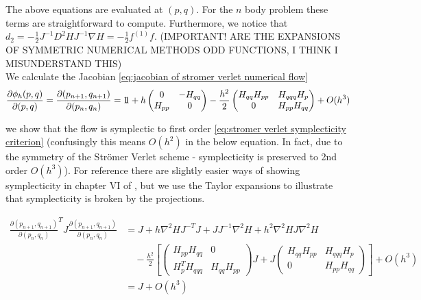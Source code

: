 \documentclass[12pt]{article}
\begin{document}
The above equations are evaluated at $(p,q)$. For the $n$ body problem these terms are straightforward to compute. Furthermore, we notice that $d_2 = -\frac{1}{2} J^{-1}D^2HJ^{-1}\nabla H = -\frac{1}{2}f^{(1)}f$. (IMPORTANT! ARE THE EXPANSIONS OF SYMMETRIC NUMERICAL METHODS ODD FUNCTIONS, I THINK I MISUNDERSTAND THIS) \\ 

We calculate the Jacobian \eqref{eq:jacobian of stromer verlet numerical flow}
\begin{equation}\label{eq:jacobian of stromer verlet numerical flow}
    \frac{\partial \phi_h(p,q)}{\partial (p,q)} = \frac{\partial(p_{n+1},q_{n+1})}{\partial (p_n,q_n)} = 1\!\!1 +
    h\begin{pmatrix} 0 & -H_{qq}\\ H_{pp} & 0 \end{pmatrix} - 
    \frac{h^2}{2} \begin{pmatrix} H_{qq}H_{pp} & H_{qqq}H_p\\ 0 & H_{pp}H_{qq} \end{pmatrix} + O(h^3)
\end{equation}

we show that the flow is symplectic to first order \eqref{eq:stromer verlet symplecticity criterion} (confusingly this means $O(h^2)$ in the below equation. In fact, due to the symmetry of the Str\"omer Verlet scheme - symplecticity is preserved to 2nd order $O(h^3)$). For reference there are slightly easier ways of showing symplecticity in chapter VI of \cite{Numerical}, but we use the Taylor expansions to illustrate that symplecticity is broken by the projections. 

\begin{equation}\label{eq:stromer verlet symplecticity criterion}
\begin{split}
\frac{\partial(p_{n+1},q_{n+1})}{\partial(p_n,q_n)}^T J\frac{\partial(p_{n+1},q_{n+1})}{\partial(p_n,q_n)} & = J + h\nabla^2H J^{-T}J + JJ^{-1}\nabla^2H + h^2\nabla^2HJ\nabla^2H\\ &\quad - \frac{h^2}{2}
\left[
\begin{pmatrix} H_{pp}H_{qq} & 0\\ H_p^TH_{qqq} & H_{qq}H_{pp} \end{pmatrix}J + J\begin{pmatrix} H_{qq}H_{pp} & H_{qqq}H_p \\ 0 & H_{pp}H_{qq} \end{pmatrix}
\right] + O(h^3)\\ & = J + O(h^3)
\end{split}
\end{equation}
\end{document}
